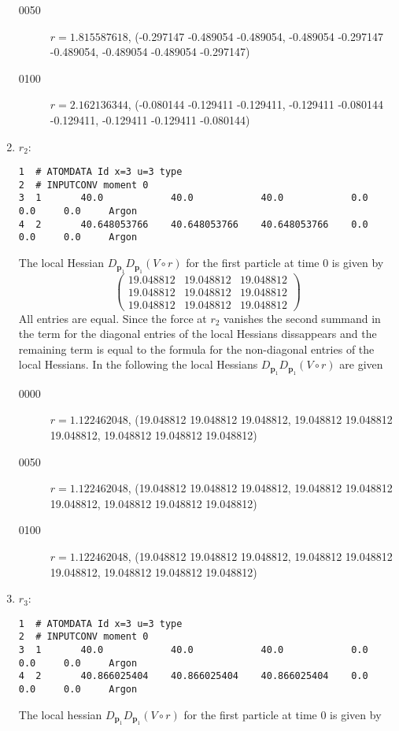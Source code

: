 \documentclass[a4paper]{article}
\newcommand{\boldp}{\boldsymbol{p}}
\begin{document}
\begin{enumerate}
\begin{description}
\item[{0050}] \(r = 1.815587618\), (-0.297147 -0.489054 -0.489054, -0.489054 -0.297147 -0.489054, -0.489054 -0.489054 -0.297147)
\item[{0100}] \(r = 2.162136344\), (-0.080144 -0.129411 -0.129411, -0.129411 -0.080144 -0.129411, -0.129411 -0.129411 -0.080144)
\end{description}
\item \(r_2\):
\label{sec-1-4-4-3}
\begin{verbatim}
1  # ATOMDATA Id x=3 u=3 type
2  # INPUTCONV moment 0
3  1       40.0            40.0            40.0            0.0     0.0     0.0     Argon
4  2       40.648053766    40.648053766    40.648053766    0.0     0.0     0.0     Argon
\end{verbatim}
The local Hessian \(D_{\boldp_1} D_{\boldp_1} (V\circ r)\) for the first particle at time 0 is given by
\[\begin{pmatrix}
19.048812 & 19.048812 & 19.048812\\
19.048812 & 19.048812 & 19.048812\\
19.048812 & 19.048812 & 19.048812
\end{pmatrix}\]
All entries are equal. Since the force at \(r_2\) vanishes the second summand in the term for the diagonal entries of the
local Hessians dissappears and the remaining term is equal to the formula for the non-diagonal entries of the local Hessians.
In the following the local Hessians \(D_{\boldp_1} D_{\boldp_1} (V\circ r)\) are given
\begin{description}
\item[{0000}] \(r = 1.122462048\), (19.048812 19.048812 19.048812, 19.048812 19.048812 19.048812, 19.048812 19.048812 19.048812)
\item[{0050}] \(r = 1.122462048\), (19.048812 19.048812 19.048812, 19.048812 19.048812 19.048812, 19.048812 19.048812 19.048812)
\item[{0100}] \(r = 1.122462048\), (19.048812 19.048812 19.048812, 19.048812 19.048812 19.048812, 19.048812 19.048812 19.048812)
\end{description}
\item \(r_3\):
\label{sec-1-4-4-4}
\begin{verbatim}
1  # ATOMDATA Id x=3 u=3 type
2  # INPUTCONV moment 0
3  1       40.0            40.0            40.0            0.0     0.0     0.0     Argon
4  2       40.866025404    40.866025404    40.866025404    0.0     0.0     0.0     Argon
\end{verbatim}
The local hessian \(D_{\boldp_1} D_{\boldp_1} (V\circ r)\) for the first particle at time 0 is given by

\end{enumerate}
\end{document}
